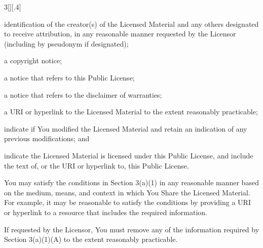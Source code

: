 \documentclass[8pt,cleardoubleempty]{scrbook}
\begin{document}
\begin{multicols}{3}[][.4\paperwidth]
\begin{longenum}
\begin{longenum}
\begin{longenum}
\begin{longenum}
                 \begin{longenum}

                 \item identification of the creator(s) of the Licensed
                       Material and any others designated to receive
                       attribution, in any reasonable manner requested by
                       the Licensor (including by pseudonym if
                       designated);

                 \item a copyright notice;

                 \item a notice that refers to this Public License;

                 \item a notice that refers to the disclaimer of
                       warranties;

                 \item a URI or hyperlink to the Licensed Material to the
                       extent reasonably practicable;

                 \end{longenum}

            \item indicate if You modified the Licensed Material and
               retain an indication of any previous modifications; and

            \item indicate the Licensed Material is licensed under this
               Public License, and include the text of, or the URI or
               hyperlink to, this Public License.

            \end{longenum}

       \item You may satisfy the conditions in Section 3(a)(1) in any
          reasonable manner based on the medium, means, and context in
          which You Share the Licensed Material. For example, it may be
          reasonable to satisfy the conditions by providing a URI or
          hyperlink to a resource that includes the required
          information.

       \item If requested by the Licensor, You must remove any of the
          information required by Section 3(a)(1)(A) to the extent
          reasonably practicable.

       \end{longenum}


\end{longenum}
\end{longenum}
\end{multicols}
\end{document}
